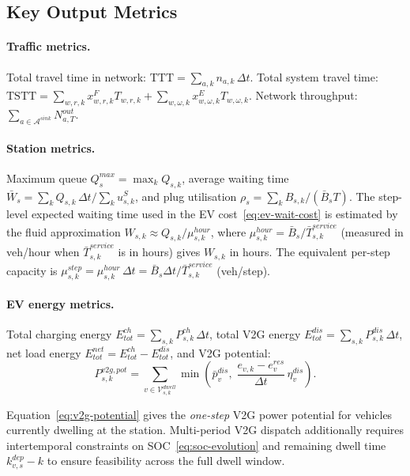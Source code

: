 \subsection{Key Output Metrics}
\label{sec:traffic-outputs}

\paragraph{Traffic metrics.}
Total travel time in network: $\mathrm{TTT} = \sum_{a,k} n_{a,k}\,\Delta t$.
Total system travel time:
$\mathrm{TSTT} = \sum_{w,r,k} x^F_{w,r,k} T_{w,r,k}
               + \sum_{w,\omega,k} x^E_{w,\omega,k} T_{w,\omega,k}$.
Network throughput: $\sum_{a \in \mathcal{A}^{sink}} N^{out}_{a,T}$.

\paragraph{Station metrics.}
Maximum queue $Q^{max}_s = \max_k Q_{s,k}$,
average waiting time $\bar{W}_s = \sum_k Q_{s,k}\,\Delta t / \sum_k u^S_{s,k}$,
and plug utilisation $\rho_s = \sum_k B_{s,k} / (\bar{B}_s T)$.
The step-level expected waiting time used in the EV cost~\eqref{eq:ev-wait-cost}
is estimated by the fluid approximation
$W_{s,k} \approx Q_{s,k} / \mu^{hour}_{s,k}$,
where
$\mu^{hour}_{s,k} = \bar{B}_s / \bar{T}^{service}_{s,k}$
(measured in veh/hour when $\bar{T}^{service}_{s,k}$ is in hours)
gives $W_{s,k}$ in hours.  The equivalent per-step capacity is
$\mu^{step}_{s,k} = \mu^{hour}_{s,k}\,\Delta t = \bar{B}_s\Delta t / \bar{T}^{service}_{s,k}$
(veh/step).

\paragraph{EV energy metrics.}
Total charging energy $E^{ch}_{tot} = \sum_{s,k} P^{ch}_{s,k}\,\Delta t$,
total V2G energy $E^{dis}_{tot} = \sum_{s,k} P^{dis}_{s,k}\,\Delta t$,
net load energy $E^{net}_{tot} = E^{ch}_{tot} - E^{dis}_{tot}$,
and V2G potential:
\begin{equation}
  P^{v2g,pot}_{s,k} =
  \sum_{v \in \mathcal{V}^{dwell}_{s,k}}
  \min\!\left(\bar{p}^{dis}_v,\;
    \frac{e_{v,k} - e^{res}_v}{\Delta t}\,\eta^{dis}_v\right).
  \label{eq:v2g-potential}
\end{equation}

Equation~\eqref{eq:v2g-potential} gives the \emph{one-step} V2G power
potential for vehicles currently dwelling at the station.  Multi-period
V2G dispatch additionally requires intertemporal constraints on
SOC~\eqref{eq:soc-evolution} and remaining dwell time
$k^{dep}_{v,s} - k$ to ensure feasibility across the full dwell window.

